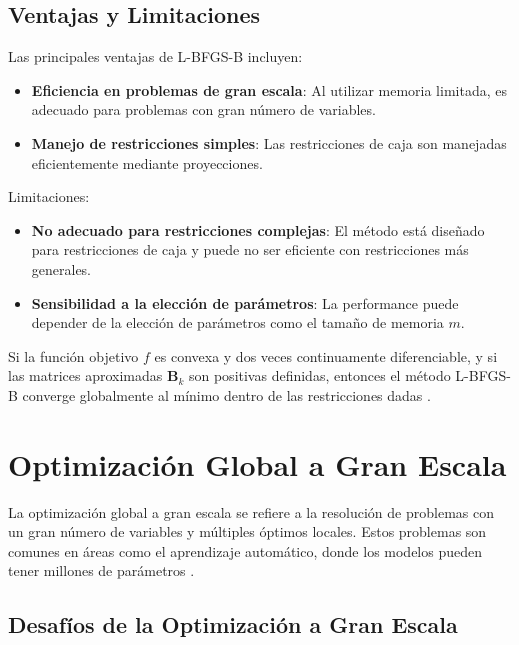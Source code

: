 \subsection{Ventajas y Limitaciones}

Las principales ventajas de L-BFGS-B incluyen:

\begin{itemize}
    \item \textbf{Eficiencia en problemas de gran escala}: Al utilizar memoria limitada, es adecuado para problemas con gran número de variables.
    \item \textbf{Manejo de restricciones simples}: Las restricciones de caja son manejadas eficientemente mediante proyecciones.
\end{itemize}

Limitaciones:

\begin{itemize}
    \item \textbf{No adecuado para restricciones complejas}: El método está diseñado para restricciones de caja y puede no ser eficiente con restricciones más generales.
    \item \textbf{Sensibilidad a la elección de parámetros}: La performance puede depender de la elección de parámetros como el tamaño de memoria $m$.
\end{itemize}

\begin{teorema}
\label{teo:convergencia}
Si la función objetivo $f$ es convexa y dos veces continuamente diferenciable, y si las matrices aproximadas $\mathbf{B}_k$ son positivas definidas, entonces el método L-BFGS-B converge globalmente al mínimo dentro de las restricciones dadas \cite{nocedal2006numerical}.
\end{teorema}

\section{Optimización Global a Gran Escala}

La optimización global a gran escala se refiere a la resolución de problemas con un gran número de variables y múltiples óptimos locales. Estos problemas son comunes en áreas como el aprendizaje automático, donde los modelos pueden tener millones de parámetros \cite{floudas2000deterministic}.

\subsection{Desafíos de la Optimización a Gran Escala}

